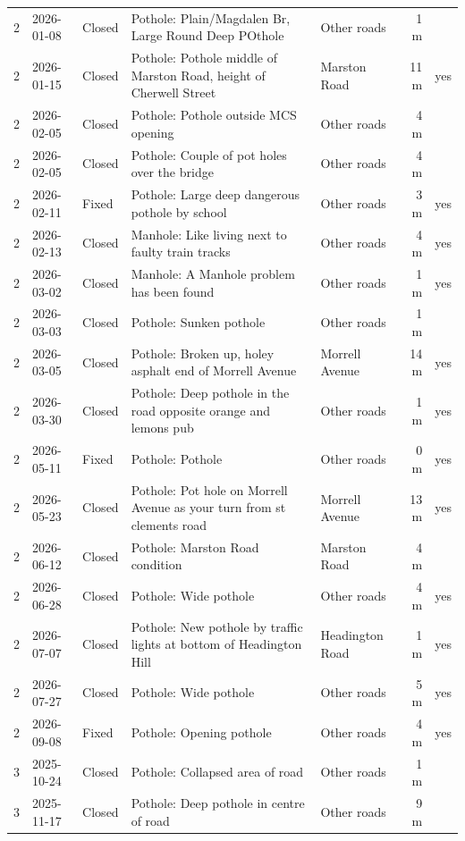 \begin{longtable}{@{}lll>{\raggedright\arraybackslash}p{46mm}lrl@{}}
2 & 2026-01-08 & Closed & Pothole: Plain/Magdalen Br, Large Round Deep POthole & Other roads & 1 m &  \\
2 & 2026-01-15 & Closed & Pothole: Pothole middle of Marston Road, height of Cherwell Street & Marston Road & 11 m & yes \\
2 & 2026-02-05 & Closed & Pothole: Pothole outside MCS opening & Other roads & 4 m &  \\
2 & 2026-02-05 & Closed & Pothole: Couple of pot holes over the bridge & Other roads & 4 m &  \\
2 & 2026-02-11 & Fixed & Pothole: Large deep dangerous pothole by school & Other roads & 3 m & yes \\
2 & 2026-02-13 & Closed & Manhole: Like living next to faulty train tracks & Other roads & 4 m & yes \\
2 & 2026-03-02 & Closed & Manhole: A Manhole problem has been found & Other roads & 1 m & yes \\
2 & 2026-03-03 & Closed & Pothole: Sunken pothole & Other roads & 1 m &  \\
2 & 2026-03-05 & Closed & Pothole: Broken up, holey asphalt end of Morrell Avenue & Morrell Avenue & 14 m & yes \\
2 & 2026-03-30 & Closed & Pothole: Deep pothole in the road opposite orange and lemons pub & Other roads & 1 m & yes \\
2 & 2026-05-11 & Fixed & Pothole: Pothole & Other roads & 0 m & yes \\
2 & 2026-05-23 & Closed & Pothole: Pot hole on Morrell Avenue as your turn from st clements road & Morrell Avenue & 13 m & yes \\
2 & 2026-06-12 & Closed & Pothole: Marston Road condition & Marston Road & 4 m &  \\
2 & 2026-06-28 & Closed & Pothole: Wide pothole & Other roads & 4 m & yes \\
2 & 2026-07-07 & Closed & Pothole: New pothole by traffic lights at bottom of Headington Hill & Headington Road & 1 m & yes \\
2 & 2026-07-27 & Closed & Pothole: Wide pothole & Other roads & 5 m & yes \\
2 & 2026-09-08 & Fixed & Pothole: Opening pothole & Other roads & 4 m & yes \\
\midrule
3 & 2025-10-24 & Closed & Pothole: Collapsed area of road & Other roads & 1 m &  \\
3 & 2025-11-17 & Closed & Pothole: Deep pothole in centre of road & Other roads & 9 m &  \\

\end{longtable}
